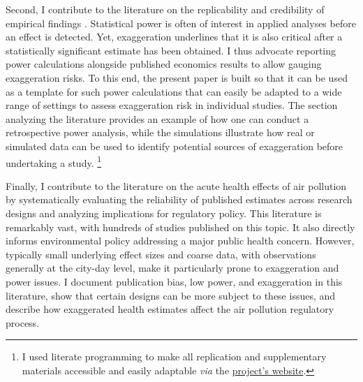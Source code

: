 \documentclass[12pt]{article}
\begin{document}
		 Second, I contribute to the literature on the replicability and credibility of empirical findings \citep{button_power_2013, open_science_collaboration_estimating_2015, christensen_transparency_2018, camerer_evaluating_2016, brodeur_methods_2020, brodeur_mass_2024}. Statistical power is often of interest in applied analyses before an effect is detected. Yet, exaggeration underlines that it is also critical after a statistically significant estimate has been obtained. I thus advocate reporting power calculations alongside published economics results to allow gauging exaggeration risks. To this end, the present paper is built so that it can be used as a template for such power calculations that can easily be adapted to a wide range of settings to assess exaggeration risk in individual studies. The section analyzing the literature provides an example of how one can conduct a retrospective power analysis, while the simulations illustrate how real or simulated data can be used to identify potential sources of exaggeration before undertaking a study. \footnote{I used literate programming to make all replication and supplementary materials accessible and easily adaptable \textit{via} the \href{https://vincentbagilet.github.io/inference_pollution/}{project's website}.}
		 
		 Finally, I contribute to the literature on the acute health effects of air pollution by systematically evaluating the reliability of published estimates across research designs and analyzing implications for regulatory policy. This literature is remarkably vast, with hundreds of studies published on this topic. It also directly informs environmental policy addressing a major public health concern. However, typically small underlying effect sizes and coarse data, with observations generally at the city-day level, make it particularly prone to exaggeration and power issues. I document publication bias, low power, and exaggeration in this literature, show that certain designs can be more subject to these issues, and describe how exaggerated health estimates affect the air pollution regulatory process.
		 
    
\end{document}
